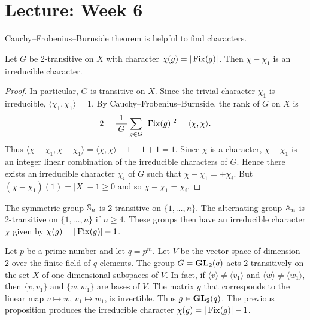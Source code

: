 \section{Lecture: Week 6}

Cauchy--Frobenius--Burnside theorem is helpful to
find characters. 

\begin{proposition}
    Let $G$ be 2-transitive on $X$ with character $\chi(g)=|\operatorname{Fix}(g)|$.
    Then $\chi-\chi_1$ is an irreducible character. 
\end{proposition}

\begin{proof}
    In particular, $G$ is transitive on $X$. 
    Since the trivial character $\chi_1$ is irreducible, $\langle\chi_1,\chi_1\rangle=1$. 
    By Cauchy--Frobenius--Burnside, the rank of $G$ on $X$ is  
    \begin{gather*}
        2=\frac{1}{|G|}\sum_{g\in G}|\operatorname{Fix}(g)|^2=\langle \chi,\chi\rangle.
   \end{gather*}
   Thus $\langle \chi-\chi_1,\chi-\chi_1\rangle=\langle\chi,\chi\rangle-1-1+1=1$.
   Since $\chi$ is a character, $\chi-\chi_1$
   is an integer linear combination of the irreducible characters of $G$.
   Hence there exists an irreducible character $\chi_i$ of $G$ such that $\chi-\chi_1=\pm\chi_i$.
   But $(\chi-\chi_1)(1)=|X|-1\geq 0$ and so $\chi-\chi_1=\chi_i$.
\end{proof}

\begin{example}
    The symmetric group $\mathbb{S}_n$ is 2-transitive on $\{1,\dots,n\}$. The
    alternating group $\mathbb{A}_n$ is 2-transitive on $\{1,\dots,n\}$ if 
    $n\geq4$. These groups then have an irreducible character $\chi$ 
    given by $\chi(g)=|\operatorname{Fix}(g)|-1$.
\end{example}

\begin{example}
    Let $p$ be a prime number and let $q=p^{m}$. Let $V$ 
    be the vector space of dimension $2$ 
    over the finite field of $q$ elements. 
    The group $G=\mathbf{GL}_2(q)$ acts 2-transitively on the set $X$ of
    one-dimensional subspaces of $V$. In fact, 
    if $\langle v\rangle\ne\langle v_1\rangle$ and $\langle w\rangle\ne\langle w_1\rangle$, 
    then $\{v,v_1\}$ and $\{w,w_1\}$ are bases of $V$. 
    The matrix $g$ that corresponds to the linear map 
    $v\mapsto w$, $v_1\mapsto w_1$, is invertible. Thus $g\in\mathbf{GL}_2(q)$. 
    The previous proposition produces the irreducible character
    $\chi(g)=|\operatorname{Fix}(g)|-1$. 
\end{example}

